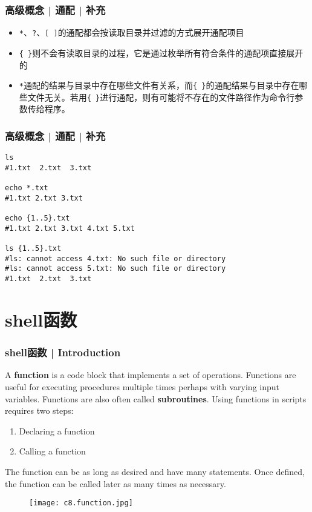 \begin{frame}[fragile]
  \frametitle{高级概念 | 通配 | 补充}
  \begin{itemize}
    \item \verb|*|、\verb|?|、\verb|[ ]|的通配都会按读取目录并过滤的方式展开通配项目
    \item \verb|{ }|则不会有读取目录的过程，它是通过枚举所有符合条件的通配项直接展开的
    \item \verb|*|通配的结果与目录中存在哪些文件有关系，而\verb|{ }|的通配结果与目录中存在哪些文件无关。若用\verb|{ }|进行通配，则有可能将不存在的文件路径作为命令行参数传给程序。
  \end{itemize}
\end{frame}

\begin{frame}[fragile]
  \frametitle{高级概念 | 通配 | 补充}
\begin{lstlisting}
ls
#1.txt  2.txt  3.txt

echo *.txt
#1.txt 2.txt 3.txt

echo {1..5}.txt
#1.txt 2.txt 3.txt 4.txt 5.txt

ls {1..5}.txt
#ls: cannot access 4.txt: No such file or directory
#ls: cannot access 5.txt: No such file or directory
#1.txt  2.txt  3.txt
\end{lstlisting}
\end{frame}

\section{shell函数}
\begin{frame}
  \frametitle{shell函数 | Introduction}
  A \textbf{function} is a code block that implements a set of operations.  Functions are useful for executing procedures multiple times perhaps with varying input variables. Functions are also often called \textbf{subroutines}. Using functions in scripts requires two steps:
  \begin{enumerate}
    \item Declaring a function
    \item Calling a function
  \end{enumerate}
  The function can be as long as desired and have many statements. Once defined, the function can be called later as many times as necessary.
  \begin{figure}
    \centering
    \texttt{[image: c8.function.jpg]}
  \end{figure}
\end{frame}


